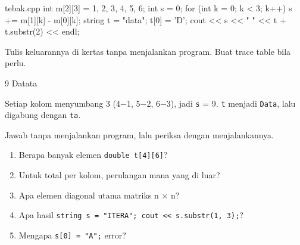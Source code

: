 \documentclass[a4paper]{article}
\begin{document}
\begin{MKode}{tebak.cpp}
int m[2][3] = {{1, 2, 3}, {4, 5, 6}};
int s = 0;
for (int k = 0; k < 3; k++) {
    s += m[1][k] - m[0][k];
}
string t = "data";
t[0] = 'D';
cout << s << " " << t + t.substr(2) << endl;
\end{MKode}
\begin{Tebak}[]
Tulis keluarannya di kertas tanpa menjalankan program. Buat trace table bila perlu.
\end{Tebak}
\begin{Jawaban}[]
\begin{MKeluaran}[]
9 Datata
\end{MKeluaran}
Setiap kolom menyumbang 3 (4−1, 5−2, 6−3), jadi \texttt{s} = 9. \texttt{t} menjadi \texttt{Data}, lalu digabung dengan \texttt{ta}.
\end{Jawaban}
\par\vspace{4pt}\par\vspace{6pt}
Jawab tanpa menjalankan program, lalu periksa dengan menjalankannya.
\begin{enumerate}
\item Berapa banyak elemen \texttt{double t[4][6]}?
\item Untuk total per kolom, perulangan mana yang di luar?
\item Apa elemen diagonal utama matriks n × n?
\item Apa hasil \texttt{string s = "ITERA"; cout << s.substr(1, 3);}?
\item Mengapa \texttt{s[0] = "A";} error?
\end{enumerate}
\end{document}
